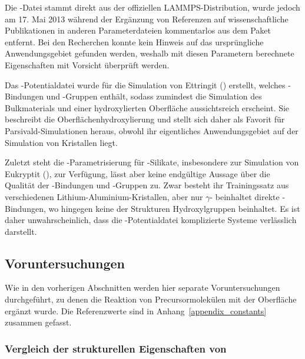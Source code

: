 Die -Datei stammt direkt aus der offiziellen LAMMPS-Distribution\cite{plimpton_lammps_2014}, wurde jedoch am 17. Mai 2013 während der Ergänzung von Referenzen auf wissenschaftliche Publikationen in anderen Parameterdateien kommentarlos aus dem Paket entfernt\cite{thompson_lammps_2013}.
Bei den Recherchen konnte kein Hinweis auf das ursprüngliche Anwendungsgebiet gefunden werden, weshalb mit diesen Parametern berechnete Eigenschaften mit Vorsicht überprüft werden.

Das -Potentialdatei wurde für die Simulation von Ettringit () erstellt, welches -Bindungen und -Gruppen enthält, sodass zumindest die Simulation des Bulkmaterials und einer hydroxylierten Oberfläche aussichtsreich erscheint.
Sie beschreibt die Oberflächenhydroxylierung und stellt sich daher als Favorit für Parsivald-Simulationen heraus, obwohl ihr eigentliches Anwendungsgebiet auf der Simulation von Kristallen liegt.

Zuletzt steht die -Parametrisierung für -Silikate, insbesondere zur Simulation von Eukryptit (), zur Verfügung, lässt aber keine endgültige Aussage über die Qualität der -Bindungen und -Gruppen zu.
Zwar besteht ihr Trainingssatz aus verschiedenen Lithium-Aluminium-Kristallen, aber nur $\gamma$- beinhaltet direkte -Bindungen, wo hingegen keine der Strukturen Hydroxylgruppen beinhaltet.
Es ist daher unwahrscheinlich, dass die -Potentialdatei komplizierte Systeme verlässlich darstellt.

\subsection{Voruntersuchungen}

Wie in den vorherigen Abschnitten werden hier separate Voruntersuchungen durchgeführt, zu denen die Reaktion von Precursormolekülen mit der Oberfläche ergänzt wurde.
Die Referenzwerte sind in Anhang~\ref{appendix_constants} zusammen gefasst.

\subsubsection{Vergleich der strukturellen Eigenschaften von }

